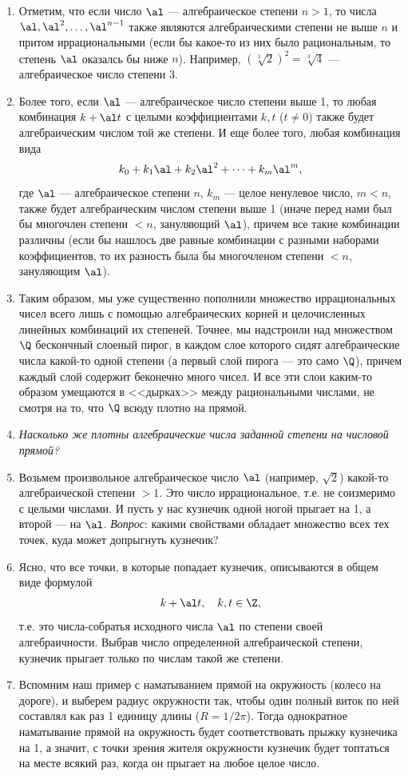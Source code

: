 \begin{enumerate}
\item Отметим, что если число $\al$ --- алгебраическое степени $n>1$, то числа $\al,\al^2,\dots,\al^{n-1}$ также являются алгебраическими степени не выше $n$ и притом иррациональными (если бы какое-то из них было рациональным, то степень $\al$ оказалсь бы ниже $n$). Например, $(\sqrt[3]{2})^2=\sqrt[3]{4}$ --- алгебраическое число степени 3.
\item Более того, если $\al$ --- алгебраическое число степени выше 1, то любая комбинация $k+\al t$ с целыми коэффициентами $k,t$ ($t\ne 0$) также будет алгебраическим числом той же степени. И еще более того, любая комбинация вида
$$
k_0+k_1\al+k_2\al^2+\dots+k_m\al^m,
$$
где $\al$ --- алгебраическое степени $n$, $k_m$ --- целое ненулевое число, $m<n$, также будет алгебраическим числом степени выше 1 (иначе перед нами был бы многочлен степени $<n$, зануляющий $\al$), причем все такие комбинации различны (если бы нашлось две равные комбинации с разными наборами коэффициентов, то их разность была бы многочленом степени $<n$, зануляющим $\al$).
\item Таким образом, мы уже существенно пополнили множество иррациональных чисел всего лишь с помощью алгебраических корней и целочисленных линейных комбинаций их степеней. Точнее, мы надстроили над множеством $\Q$ бескончный слоеный пирог, в каждом слое которого сидят алгебраические числа какой-то одной степени (а первый слой пирога --- это само $\Q$), причем каждый слой содержит беконечно много чисел. И все эти слои каким-то образом умещаются в <<дырках>> между рациональными числами, не смотря на то, что $\Q$ всюду плотно на прямой.
\item \textit{Насколько же плотны алгебраические числа заданной степени на числовой прямой?}
\item Возьмем произвольное алгебраическое число $\al$ (например, $\sqrt 2$) какой-то алгебраической степени $>1$. Это число иррациональное, т.е. не соизмеримо с целыми числами. И пусть у нас кузнечик одной ногой прыгает на 1, а второй --- на $\al$. \textit{Вопрос}: какими свойствами обладает множество всех тех точек, куда может допрыгнуть кузнечик?
\item Ясно, что все точки, в которые попадает кузнечик, описываются в общем виде формулой
$$
k + \al t,\quad k,t\in\Z,
$$
т.е. это числа-собратья исходного числа $\al$ по степени своей алгебраичности. Выбрав число определенной алгебраической степени, кузнечик прыгает только по числам такой же степени.
\item Вспомним наш пример с наматыванием прямой на окружность (колесо на дороге), и выберем радиус окружности так, чтобы один полный виток по ней составлял как раз 1 единицу длины ($R=1/2\pi$). Тогда однократное наматывание прямой на окружность будет соответствовать прыжку кузнечика на 1, а значит, с точки зрения жителя окружности кузнечик будет топтаться на месте всякий раз, когда он прыгает на любое целое число.

\end{enumerate}
